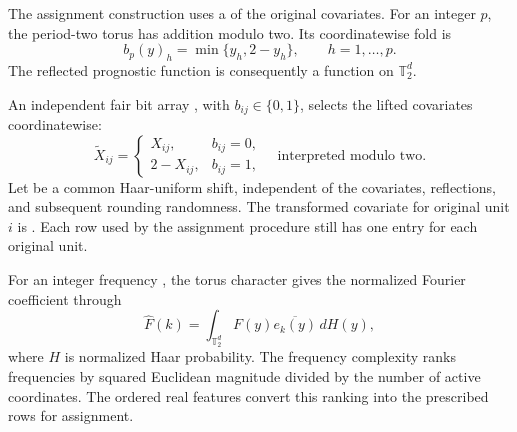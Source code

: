\documentclass[11pt]{article}
\begin{document}
The assignment construction uses a  of the original covariates. For an integer \(p\), the period-two torus \leanref{sym:Torus}{\ensuremath{\mathbb T_2^p=[0,2)^p}} has addition modulo two. Its coordinatewise fold  is
\[
b_p(y)_h=\min\{y_h,2-y_h\},
\qquad h=1,\ldots,p.
\]
The reflected prognostic function  is consequently a function on \(\mathbb T_2^d\).

An independent fair bit array , with \(b_{ij}\in\{0,1\}\), selects the lifted covariates  coordinatewise:
\[
\widetilde X_{ij}
=
\begin{cases}
X_{ij},&b_{ij}=0,\\
2-X_{ij},&b_{ij}=1,
\end{cases}
\quad\text{interpreted modulo two}.
\]
Let  be a common Haar-uniform shift, independent of the covariates, reflections, and subsequent rounding randomness. The transformed covariate for original unit \(i\) is . Each row used by the assignment procedure still has one entry for each original unit.

For an integer frequency , the torus character  gives the normalized Fourier coefficient  through
\[
\widehat F(k)
=
\int_{\mathbb T_2^d}F(y)\overline{e_k(y)}\,dH(y),
\]
where \(H\) is normalized Haar probability. The frequency complexity  ranks frequencies by squared Euclidean magnitude divided by the number of active coordinates. The ordered real features  convert this ranking into the prescribed rows for assignment.
\end{document}

